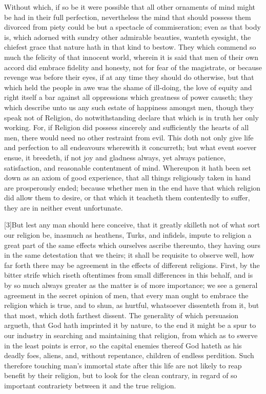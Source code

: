 Without which, if so be it were possible that all other ornaments of mind might be had in their full perfection, nevertheless the mind that should possess them divorced from piety could be but a spectacle of commiseration; even as that body is, which adorned with sundry other admirable beauties, wanteth eyesight, the chiefest grace that nature hath in that kind to bestow. They which commend so much the felicity of that innocent world, wherein it is said that men of their own accord did embrace fidelity and honesty, not for fear of the magistrate, or because revenge was before their eyes, if at any time they  should do otherwise,
 but that which held the people in awe was the shame of ill-doing, the love of equity and right itself a bar against all oppressions which greatness of power causeth; they which describe unto us any such estate of happiness amongst men, though they speak not of Religion, do notwithstanding declare that which is in truth her only working. For, if Religion did possess sincerely and sufficiently the hearts of all men, there would need no other restraint from evil. This doth not only give life and perfection to all endeavours wherewith it concurreth; but what event soever ensue, it breedeth, if not joy and gladness always, yet always patience, satisfaction, and reasonable contentment of mind. Whereupon it hath been set down as an axiom of good experience, that all things religiously taken in hand are prosperously ended; because whether men in the end have that which religion did allow them to desire, or that which it teacheth them contentedly to suffer, they are in neither event unfortunate.

[3]But lest any man should here conceive, that it greatly skilleth not of what sort our religion be, inasmuch as heathens, Turks, and infidels, impute to religion a great part of the same effects which ourselves ascribe thereunto, they having ours in the same detestation that we theirs; it shall be requisite to observe well, how far forth there may be agreement in the effects of different religions. First, by the bitter strife which riseth oftentimes from small differences in this behalf, and is by so much always greater as the matter is of more importance; we see a general agreement in the secret opinion of men, that every man ought to embrace the religion which is true, and to shun, as hurtful, whatsoever dissenteth from it, but that most, which doth farthest dissent. The generality of which persuasion argueth, that God hath imprinted it by nature, to the end it might be a spur to our industry in searching and maintaining that religion, from which as to swerve in the least points is error, so the capital enemies thereof God hateth as his deadly foes, aliens, and, without repentance, children of endless perdition. Such therefore touching man’s immortal state after this life are not likely to reap benefit by their  religion, but to look for the clean contrary, in regard of so important contrariety between it and the true religion.

